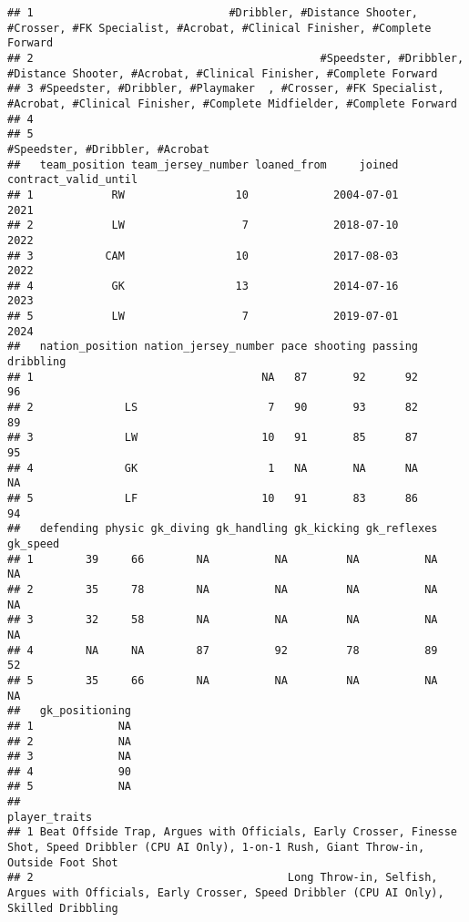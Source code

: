 \documentclass[
]{article}
\begin{document}
\begin{verbatim}
## 1                              #Dribbler, #Distance Shooter, #Crosser, #FK Specialist, #Acrobat, #Clinical Finisher, #Complete Forward
## 2                                            #Speedster, #Dribbler, #Distance Shooter, #Acrobat, #Clinical Finisher, #Complete Forward
## 3 #Speedster, #Dribbler, #Playmaker  , #Crosser, #FK Specialist, #Acrobat, #Clinical Finisher, #Complete Midfielder, #Complete Forward
## 4                                                                                                                                     
## 5                                                                                                      #Speedster, #Dribbler, #Acrobat
##   team_position team_jersey_number loaned_from     joined contract_valid_until
## 1            RW                 10             2004-07-01                 2021
## 2            LW                  7             2018-07-10                 2022
## 3           CAM                 10             2017-08-03                 2022
## 4            GK                 13             2014-07-16                 2023
## 5            LW                  7             2019-07-01                 2024
##   nation_position nation_jersey_number pace shooting passing dribbling
## 1                                   NA   87       92      92        96
## 2              LS                    7   90       93      82        89
## 3              LW                   10   91       85      87        95
## 4              GK                    1   NA       NA      NA        NA
## 5              LF                   10   91       83      86        94
##   defending physic gk_diving gk_handling gk_kicking gk_reflexes gk_speed
## 1        39     66        NA          NA         NA          NA       NA
## 2        35     78        NA          NA         NA          NA       NA
## 3        32     58        NA          NA         NA          NA       NA
## 4        NA     NA        87          92         78          89       52
## 5        35     66        NA          NA         NA          NA       NA
##   gk_positioning
## 1             NA
## 2             NA
## 3             NA
## 4             90
## 5             NA
##                                                                                                                                         player_traits
## 1 Beat Offside Trap, Argues with Officials, Early Crosser, Finesse Shot, Speed Dribbler (CPU AI Only), 1-on-1 Rush, Giant Throw-in, Outside Foot Shot
## 2                                       Long Throw-in, Selfish, Argues with Officials, Early Crosser, Speed Dribbler (CPU AI Only), Skilled Dribbling

\end{verbatim}
\end{document}
